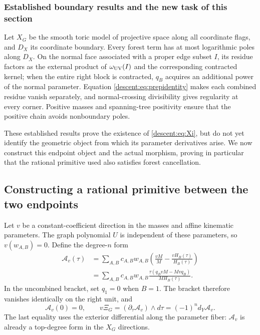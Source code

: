 \documentclass[11pt,a4paper,oneside]{article}
\theoremstyle{plain}
\theoremstyle{definition}
\theoremstyle{remark}
\numberwithin{equation}{section}
\begin{document}
\subsubsection{Established boundary results and the new task of this section}
Let $X_G$ be the smooth toric model of projective space along all coordinate flags, and $D_X$ its coordinate boundary.
Every forest term has at most logarithmic poles along $D_X$.
On the normal face associated with a proper edge subset $I$, its residue factors as the external product of $\omega_{\rm UV}(I)$ and the corresponding contracted kernel; when the entire right block is contracted, $q_B$ acquires an additional power of the normal parameter.
Equation \eqref{descent:eq:prepidentity} makes each combined residue vanish separately, and normal-crossing divisibility gives regularity at every corner.
Positive masses and spanning-tree positivity ensure that the positive chain avoids nonboundary poles.

These established results prove the existence of \eqref{descent:eq:Xi}, but do not yet identify the geometric object from which its parameter derivatives arise.
We now construct this endpoint object and the actual morphism, proving in particular that the rational primitive used also satisfies forest cancellation.


\subsection{Constructing a rational primitive between the two endpoints}
Let $v$ be a constant-coefficient direction in the masses and affine kinematic parameters.
The graph polynomial $U$ is independent of these parameters, so $v(w_{A,B})=0$.
Define the degree-$n$ form
\begin{align}\label{descent:eq:Hprimitive}
 \mathcal A_v(\tau)
 &=\sum_{A,B}c_{A,B}w_{A,B}
       \left(\frac{vM}{M}-\frac{vH_B(\tau)}{H_B(\tau)}\right)\nonumber\\
 &=\sum_{A,B}c_{A,B}w_{A,B}
       \frac{\tau(q_BvM-Mvq_B)}{M H_B(\tau)}.
\end{align}
In the uncombined bracket, set $q_1=0$ when $B=1$.
The bracket therefore vanishes identically on the right unit, and
\begin{equation}\label{descent:eq:endpointzero}
 \mathcal A_v(0)=0,\qquad
 v\Xi_G=(\partial_\tau\mathcal A_v)\wedge d\tau
             =(-1)^n d_Y\mathcal A_v.
\end{equation}
The last equality uses the exterior differential along the parameter fiber: $\mathcal A_v$ is already a top-degree form in the $X_G$ directions.
\end{document}
